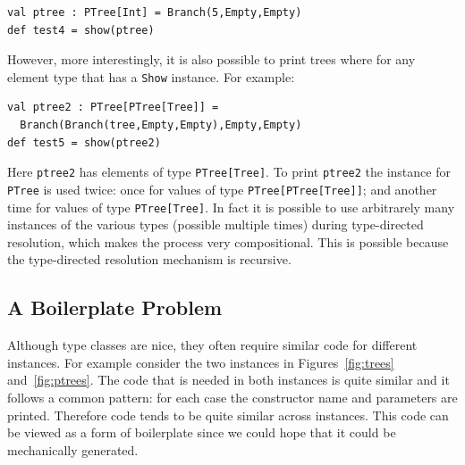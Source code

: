\documentclass[preprint,nocopyrightspace]{sigplanconf}
\begin{document}
\begin{lstlisting}
val ptree : PTree[Int] = Branch(5,Empty,Empty)
def test4 = show(ptree)
\end{lstlisting}

However, more interestingly, it is also possible to print trees where
for any element type that has a \lstinline{Show} instance. For example:

\begin{lstlisting}
val ptree2 : PTree[PTree[Tree]] =
  Branch(Branch(tree,Empty,Empty),Empty,Empty)
def test5 = show(ptree2)
\end{lstlisting}

\noindent Here \lstinline{ptree2} has elements of type
\lstinline{PTree[Tree]}. To print \lstinline{ptree2} the instance for
\lstinline{PTree} is used twice: once for values of type
\lstinline{PTree[PTree[Tree]]}; and another time for values of
type \lstinline{PTree[Tree]}. In fact it is possible to use
arbitrarely many instances of the various types (possible multiple
times) during type-directed resolution, which makes the process very
compositional. This is possible because the type-directed resolution
mechanism is recursive.

\subsection{A Boilerplate Problem}

Although type classes are nice, they often require similar code for
different instances. For example consider the two instances
in Figures~\ref{fig:trees} and~\ref{fig:ptrees}. The code that is
needed in both instances is quite similar and it follows a common
pattern: for each case the constructor name and parameters are
printed. Therefore code tends to be quite similar across instances. This
code can be viewed as a form of boilerplate since we could hope that
it could be mechanically generated. 




%
\end{document}
